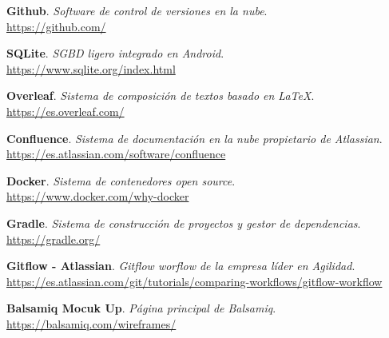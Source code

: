 \begin{thebibliography}{X}
\begin{multicols}{2}
    \textbf{Github}. \textit{Software de control de versiones en la nube}. \\
    \small{\url{https://github.com/}}
    
    \textbf{SQLite}. \textit{SGBD ligero integrado en Android}. \\
    \small{\url{https://www.sqlite.org/index.html}}
    
    \textbf{Overleaf}. \textit{Sistema de composición de textos basado en \LaTeX}. \\
    \small{\url{https://es.overleaf.com/}}
    
    \textbf{Confluence}. \textit{Sistema de documentación en la nube propietario de Atlassian}. \\
    \small{\url{https://es.atlassian.com/software/confluence}}
    
    \textbf{Docker}. \textit{Sistema de contenedores open source}. \\
    \small{\url{https://www.docker.com/why-docker}}
    
    \textbf{Gradle}. \textit{Sistema de construcción de proyectos y gestor de dependencias}. \\
    \small{\url{https://gradle.org/}}
    
    \textbf{Gitflow - Atlassian}. \textit{Gitflow worflow de la empresa líder en Agilidad}. \\
    \small{\url{https://es.atlassian.com/git/tutorials/comparing-workflows/gitflow-workflow}}
    
    \textbf{Balsamiq Mocuk Up}. \textit{Página principal de Balsamiq}. \\
    \small{\url{https://balsamiq.com/wireframes/}}

\end{multicols}
\end{thebibliography}